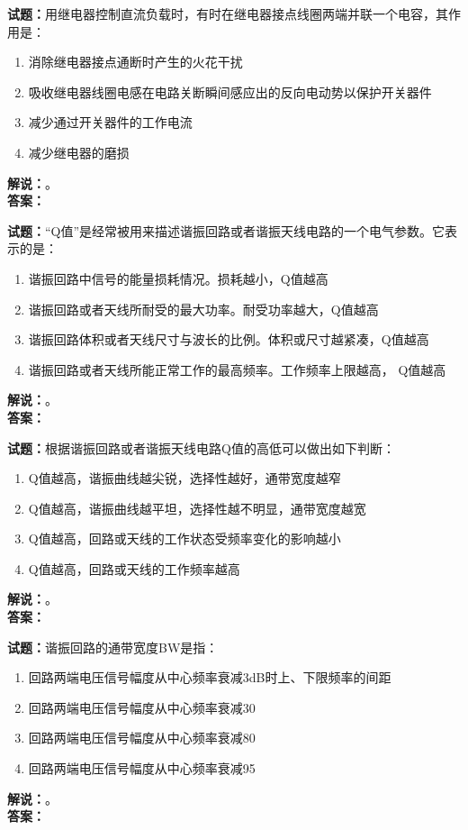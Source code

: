 \documentclass{ctexbook}
\begin{document}
\noindent\textbf{试题：}用继电器控制直流负载时，有时在继电器接点线圈两端并联一个电容，其作用是：
\begin{enumerate}[leftmargin=3em]
  \item 消除继电器接点通断时产生的火花干扰
  \item 吸收继电器线圈电感在电路关断瞬间感应出的反向电动势以保护开关器件
  \item 减少通过开关器件的工作电流
  \item 减少继电器的磨损
\end{enumerate}
\noindent\textbf{解说：}\textbf{}。\\\noindent\textbf{答案：}

\vspace{\baselineskip}

\noindent\textbf{试题：}“Q值”是经常被用来描述谐振回路或者谐振天线电路的一个电气参数。它表示的是：
\begin{enumerate}[leftmargin=3em]
  \item 谐振回路中信号的能量损耗情况。损耗越小，Q值越高
  \item 谐振回路或者天线所耐受的最大功率。耐受功率越大，Q值越高
  \item 谐振回路体积或者天线尺寸与波长的比例。体积或尺寸越紧凑，Q值越高
  \item 谐振回路或者天线所能正常工作的最高频率。工作频率上限越高， Q值越高
\end{enumerate}
\noindent\textbf{解说：}\textbf{}。\\\noindent\textbf{答案：}

\vspace{\baselineskip}

\noindent\textbf{试题：}根据谐振回路或者谐振天线电路Q值的高低可以做出如下判断：
\begin{enumerate}[leftmargin=3em]
  \item Q值越高，谐振曲线越尖锐，选择性越好，通带宽度越窄
  \item Q值越高，谐振曲线越平坦，选择性越不明显，通带宽度越宽
  \item Q值越高，回路或天线的工作状态受频率变化的影响越小
  \item Q值越高，回路或天线的工作频率越高
\end{enumerate}
\noindent\textbf{解说：}\textbf{}。\\\noindent\textbf{答案：}

\vspace{\baselineskip}

\noindent\textbf{试题：}谐振回路的通带宽度BW是指：
\begin{enumerate}[leftmargin=3em]
  \item 回路两端电压信号幅度从中心频率衰减3dB时上、下限频率的间距
  \item 回路两端电压信号幅度从中心频率衰减30%
  \item 回路两端电压信号幅度从中心频率衰减80%
  \item 回路两端电压信号幅度从中心频率衰减95%
\end{enumerate}
\noindent\textbf{解说：}\textbf{}。\\\noindent\textbf{答案：}
\end{document}
